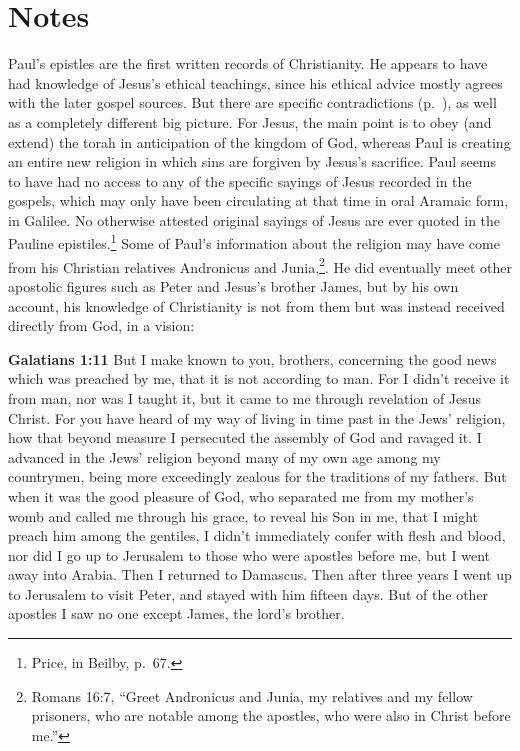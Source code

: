 \documentclass[10pt,a5paper,twoside]{article}
\newcommand{\quotesize}{\normalsize{}}
\newcommand{\maintextquotesize}{\renewcommand{\quotesize}{\large{}}}
\newcommand{\notequotesize}{\renewcommand{\quotesize}{\normalsize{}}}
\newenvironment{quotetext}{\begingroup\quotesize}{\endgroup}
\newcommand{\intex}[1]{\index[texts]{#1}}
\newcommand{\reftex}[1]{#1\intex{#1}}
\newcommand{\bible}[2]{\begin{quotetext}\textbf{#1}\intex{#1} #2\end{quotetext}}
\newenvironment{notesection}[1]{
  \setcounter{secnumdepth}{0}          %
  \section*{#1}
  \setcounter{secnumdepth}{2}          %
  \notequotesize
}%
{
  \maintextquotesize
}
\begin{document}
\begin{notesection}{Notes}
Paul's epistles are the first written records of Christianity. He appears to have had knowledge of
Jesus's ethical teachings, since his ethical advice mostly agrees with the later gospel sources.
But there are specific contradictions (p.~\pageref{paul-contradicts-gospels}), as well as a completely
different big picture. For Jesus, the main point is to obey (and extend) the torah in anticipation of
the kingdom of God, whereas Paul is creating an entire new religion in which sins are
forgiven by Jesus's sacrifice. Paul seems to have had
no access to any of the specific sayings of Jesus recorded in the gospels, which may only have been
circulating at that time in oral Aramaic form, in Galilee. No otherwise attested original sayings of Jesus are ever quoted in the Pauline
epistiles.\footnote{Price, in Beilby, p.~67.}
Some of Paul's information about the religion may have come from his Christian relatives Andronicus and Junia,\footnote{\reftex{Romans 16:7},
``Greet Andronicus and Junia, my relatives and my fellow prisoners, who are notable among the apostles, who were also in Christ before me.''}.
He did eventually meet other apostolic figures such as Peter and Jesus's brother James, but
by his own account, his knowledge of Christianity is not from them but was instead
received directly from God, in a vision:


\bible{Galatians 1:11}{
But I make known to you, brothers, concerning the good news which was preached by me, that it is not according to man.   For I didn't receive it from man, nor was I taught it, but it came to me through revelation of Jesus Christ.   For you have heard of my way of living in time past in the Jews' religion, how that beyond measure I persecuted the assembly of God and ravaged it.   I advanced in the Jews' religion beyond many of my own age among my countrymen, being more exceedingly zealous for the traditions of my fathers.   But when it was the good pleasure of God, who separated me from my mother's womb and called me through his grace,   to reveal his Son in me, that I might preach him among the gentiles, I didn't immediately confer with flesh and blood,   nor did I go up to Jerusalem to those who were apostles before me, but I went away into Arabia. Then I returned to Damascus.
  Then after three years I went up to Jerusalem to visit Peter, and stayed with him fifteen days.   But of the other apostles I saw no one except James, the lord's brother. 
}


\end{notesection}
\end{document}
